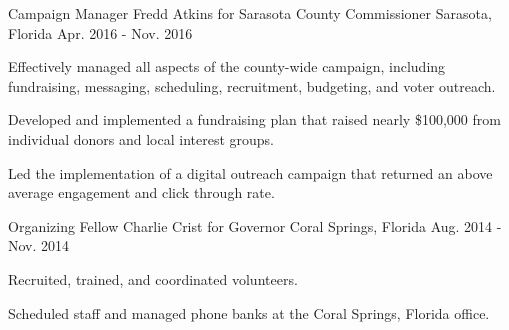 \begin{cventries}
  \cventry
    {Campaign Manager} %
    {Fredd Atkins for Sarasota County Commissioner} %
    {Sarasota, Florida} %
    {Apr. 2016 - Nov. 2016} %
    {
      \begin{cvitems} %
        \item {Effectively managed all aspects of the county-wide campaign, including fundraising, messaging, scheduling, recruitment, budgeting, and voter outreach.}
        \item {Developed and implemented a fundraising plan that raised nearly \$100,000 from individual donors and local interest groups.}
        \item {Led the implementation of a digital outreach campaign that returned an above average engagement and click through rate.}
      \end{cvitems}
    }

  \cventry
    {Organizing Fellow} %
    {Charlie Crist for Governor} %
    {Coral Springs, Florida} %
    {Aug. 2014 - Nov. 2014} %
    {
      \begin{cvitems} %
        \item {Recruited, trained, and coordinated volunteers.}
        \item {Scheduled staff and managed phone banks at the Coral Springs, Florida office.}
      \end{cvitems}
    }

\end{cventries}
